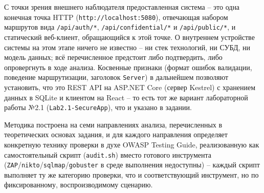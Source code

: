 

С точки зрения внешнего наблюдателя предоставленная система -- это одна
конечная точка HTTP (\texttt{http://localhost:5080}), отвечающая набором
маршрутов вида \texttt{/api/auth/*}, \texttt{/api/confidential/*} и
\texttt{/api/public/*}, и статический веб-клиент, обращающийся к этой
точке. О внутреннем устройстве системы на этом этапе ничего не известно
-- ни стек технологий, ни СУБД, ни модель данных; всё перечисленное
предстоит либо подтвердить, либо опровергнуть в ходе анализа. Косвенные
признаки (формат ошибок валидации, поведение маршрутизации, заголовок
\texttt{Server}) в дальнейшем позволяют установить, что это REST API на
ASP.NET Core (сервер Kestrel) с хранением данных в SQLite и
клиентом на React -- то есть тот же вариант лабораторной работы №2.1
(\texttt{Lab2.1-SecureApp}), что и указано в задании.


Методика построена на семи направлениях анализа, перечисленных в
теоретических основах задания, и для каждого направления определяет
конкретную технику проверки в духе OWASP Testing Guide, реализованную
как самостоятельный скрипт (\texttt{audit.sh}) вместо готового
инструмента (\texttt{ZAP}/\texttt{nikto}/\texttt{sqlmap}/\texttt{gobuster}
в среде выполнения недоступны) -- каждый скрипт выполняет ту же
категорию проверки, что и соответствующий инструмент, но по фиксированному,
воспроизводимому сценарию.

